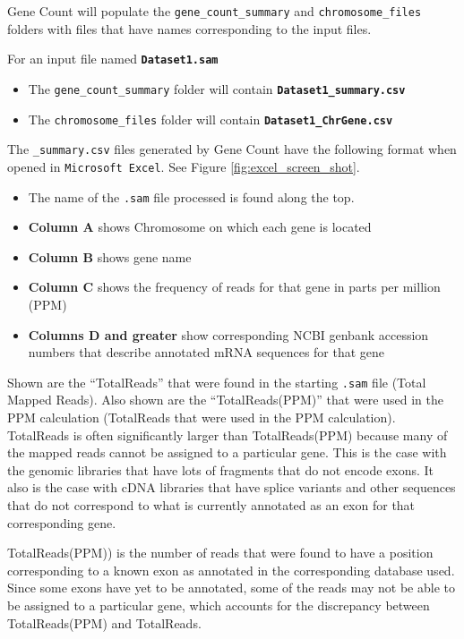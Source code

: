 \documentclass[11pt,fleqn]{book} %
\newcommand{\GeneCount}{{\color{Red} Gene Count }}
\begin{document}
\GeneCount will populate the \texttt{gene\_count\_summary} and \texttt{chromosome\_files} folders with files that have names corresponding to the input files. 

For an input file named \textbf{\texttt{Dataset1.sam}}
\begin{itemize}
	\item The \texttt{gene\_count\_summary} folder will contain \textbf{\texttt{Dataset1\_summary.csv}}
	\item The \texttt{chromosome\_files} folder will contain \textbf{\texttt{Dataset1\_ChrGene.csv}}
\end{itemize}

\vspace{15pt}
The \texttt{\_summary.csv} files generated by \GeneCount have the following format when opened in \texttt{Microsoft Excel}. See Figure \ref{fig:excel_screen_shot}.

\begin{itemize}
	\item The name of the \texttt{.sam} file processed is found along the top.
	\item \textbf{Column A} shows Chromosome on which each gene is located
	\item \textbf{Column B} shows gene name
	\item \textbf{Column C} shows the frequency of reads for that gene in parts per million (PPM)
	\item \textbf{Columns D and greater} show corresponding NCBI genbank accession numbers that describe annotated mRNA sequences for that gene
\end{itemize}

Shown are the ``TotalReads'' that were found in the starting \texttt{.sam} file (Total Mapped Reads). Also shown are the ``TotalReads(PPM)'' that were used in the PPM calculation (TotalReads that were used in the PPM calculation).  TotalReads is often significantly larger than TotalReads(PPM) because many of the mapped reads cannot be assigned to a particular gene.  This is the case with the genomic libraries that have lots of fragments that do not encode exons.  It also is the case with cDNA libraries that have splice variants and other sequences that do not correspond to what is currently annotated as an exon for that corresponding gene.

\begin{remark}
TotalReads(PPM)) is the number of reads that were found to have a position corresponding to a known exon as annotated in the corresponding database used. Since some exons have yet to be annotated, some of the reads may not be able to be assigned to a particular gene, which accounts for the discrepancy between TotalReads(PPM) and TotalReads.
\end{remark}
\end{document}
